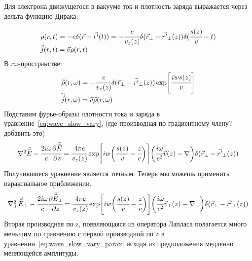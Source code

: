 \documentclass[14pt,a4paper]{extarticle}
\numberwithin{equation}{section}
\begin{document}
Для электрона движущегося в вакууме ток и плотность заряда выражается через дельта-функцию Дирака:

\begin{equation}
	\begin{array}{lcl}
		\rho(r,t) = -e\delta(\vec{r}- \vec{r'}(t)) = -\cfrac{e}{v_z(z)}\delta(\vec{r}_{\bot}- \vec{r'}_{\bot}(z))\delta(\cfrac{s(z)}{v} - t)\\
		\vec{j}(r,t) = \vec{v}\rho(r,t)	
	\end{array}
\end{equation} 
В $r\omega$-пространстве: 
\begin{equation}
	\begin{array}{lcl}
		\widetilde{\rho}(r,\omega) = -\cfrac{e}{v_z(z)}\delta(\vec{r}_{\bot}- \vec{r'}_{\bot}(z))\exp[\cfrac{iws(z)}{v}]\\
		\widetilde{\vec{j}}(r,\omega) = \vec{v}\widetilde{\rho}(r,\omega)	
	\end{array}
\end{equation} 
Подставим фурье-образы плотности тока и заряда в уравнение~\ref{eq:wave_slow_vary}, (где производная по градиентному члену? добавить это)
\begin{equation}
	\label{eq:wave_eq}
	\begin{array}{lcl}
		\nabla^2 \vec{\widetilde{E}} - \cfrac{2i\omega}{c}\cfrac{\partial\vec{\widetilde{E}}}{\partial z} = 
		\cfrac{4\pi e}{v_z(z)} \exp[iw\bigg(\cfrac{s(z)}{v} - \cfrac{z}{c}\bigg)]
		\bigg(  
			\cfrac{i\omega}{c^2}\vec{v}(z)
			-\nabla\bigg) \delta(\vec{r}_{\bot} - \vec{r'}_{\bot}(z)) 
		
	\end{array}
\end{equation} 
Получившиеся уравнение является точным. Теперь мы можешь применить параксиальное приближении. 
\begin{equation}
	\label{eq:wave_slow_vary_parax}
	\begin{array}{lcl}
		\nabla_{\bot}^2 \vec{\widetilde{E}}_{\bot} - \cfrac{2i\omega}{c}\cfrac{\partial\vec{\widetilde{E}}_{\bot}}{\partial z} = 
		\cfrac{4\pi e}{v_z(z)} \exp[iw\bigg(\cfrac{s(z)}{v} - \cfrac{z}{c}\bigg)]\bigg(  
			\cfrac{i\omega}{c^2}\vec{v}_{\bot}(z) 
			-\nabla_{\bot}\bigg) \delta(\vec{r}_{\bot} - \vec{r'}_{\bot}(z)) 
	\end{array}
\end{equation} 
Вторая производная по z, появляющаяся из оператора Лапласа полагается много меньшим по сравнению с первой производной по $z$ в уравнении~\ref{eq:wave_slow_vary_parax} исходя из предположения медленно меняющейся амплитуды.
\end{document}
